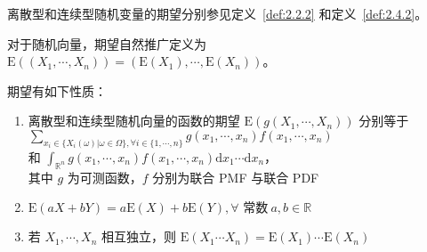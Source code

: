 \documentclass[../main.tex]{subfiles}
\begin{document}
离散型和连续型随机变量的期望分别参见定义~\ref{def:2.2.2} 和定义~\ref{def:2.4.2}。

对于随机向量，期望自然推广定义为 $\mathrm E((X_1,\cdots,X_n))=(\mathrm E(X_1),\cdots,\mathrm E(X_n))$。

\begin{proposition}
    期望有如下性质：
    \begin{enumerate}
        \item 离散型和连续型随机向量的函数的期望 $\mathrm E(g(X_1,\cdots,X_n))$ 分别等于\\
              $\sum_{x_i\in\{X_i(\omega)|\omega\in\Omega\},\forall i\in\{1,\cdots,n\}}g(x_1,\cdots,x_n)f(x_1,\cdots,x_n)$\\
              和 $\int_{\mathbb R^n}g(x_1,\cdots,x_n)f(x_1,\cdots,x_n)\mathrm dx_1\cdots\mathrm dx_n$，\\
              其中 $g$ 为可测函数，$f$ 分别为联合 PMF 与联合 PDF
        \item $\mathrm E(aX+bY)=a\mathrm E(X)+b\mathrm E(Y),\forall\text{ 常数}\ a,b\in\mathbb R$
        \item 若 $X_1,\cdots,X_n$ 相互独立，则 $\mathrm E(X_1\cdots X_n)=\mathrm E(X_1)\cdots\mathrm E(X_n)$
    \end{enumerate}
\end{proposition}
\end{document}
